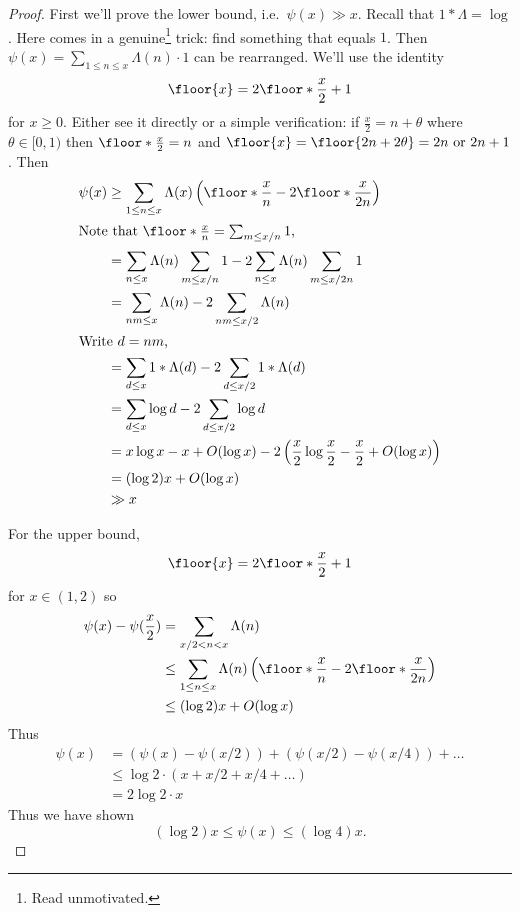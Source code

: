 \documentclass[a4paper]{article}
\begin{document}
\begin{proof}
  First we'll prove the lower bound, i.e.\ \(\psi(x) \gg x\). Recall that \(1 * \Lambda = \log\). Here comes in a genuine\footnote{Read unmotivated.} trick: find something that equals \(1\). Then \(\psi(x) = \sum_{1 \leq n \leq x} \Lambda(n) \cdot 1\) can be rearranged. We'll use the identity
  \[
    \floor{x} = 2 \floor*{\frac{x}{2}} + 1
  \]
  for \(x \geq 0\). Either see it directly or a simple verification: if \(\frac{x}{2} = n + \theta\) where \(\theta \in [0, 1)\) then \(\floor*{\frac{x}{2}} = n\) and \(\floor{x} = \floor{2n + 2\theta} = 2n \text{ or } 2n + 1\). Then
  \begin{align*}
    \psi(x)
    &\geq \sum_{1 \leq n \leq x} \Lambda(x) \left( \floor*{\frac{x}{n}} - 2 \floor*{\frac{x}{2n}} \right)\\
    \intertext{Note that \(\floor*{\frac{x}{n}} = \sum_{m \leq x/n} 1\),}
    &=\sum_{n \leq x} \Lambda(n) \sum_{m \leq x/n} 1 - 2 \sum_{n \leq x} \Lambda(n) \sum_{m \leq x/2n} 1 \\
    &=  \sum_{nm \leq x} \Lambda(n) - 2 \sum_{nm \leq x/2} \Lambda(n) \\
    \intertext{Write \(d = nm\),}
    &= \sum_{d \leq x} 1 * \Lambda(d) - 2 \sum_{d \leq x/2} 1 * \Lambda(d) \\
    &= \sum_{d \leq x} \log d - 2 \sum_{d \leq x/2} \log d \\
    &= x \log x - x + O(\log x) - 2 \left( \frac{x}{2} \log \frac{x}{2} - \frac{x}{2} + O(\log x) \right) \\
    &= (\log 2) x + O(\log x) \\
    &\gg x
  \end{align*}

  For the upper bound,
  \[
    \floor{x} = 2 \floor*{\frac{x}{2}} + 1
  \]
  for \(x \in (1, 2)\) so
  \begin{align*}
    \psi(x) - \psi(\frac{x}{2})
    &= \sum_{x/2 < n < x} \Lambda(n) \\
    &\leq \sum_{1 \leq n \leq x} \Lambda(n) \left( \floor*{\frac{x}{n}} - 2 \floor*{\frac{x}{2n}} \right) \\
    & \leq (\log 2) x + O(\log x)
  \end{align*}
  Thus
  \begin{align*}
    \psi(x)
    &= (\psi(x) - \psi(x/2)) + (\psi(x/2) - \psi(x/4)) + \dots \\
    &\leq \log 2 \cdot (x + x/2 + x/4 + \dots ) \\
    &= 2 \log 2 \cdot x
  \end{align*}
  Thus we have shown
  \[
    (\log 2) x \leq \psi(x) \leq (\log 4) x.
  \]
\end{proof}
\end{document}
